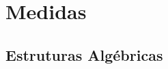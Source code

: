 \chapter{Medidas}
\lipsum[1-2]  %
\section{Estruturas Algébricas}
\hereditaryCollection
\ringOfSets
\sigmaRing
\algebraOfSets
\sigmaAlgebra
\measurableSpace
\generateSigmaAlgebra